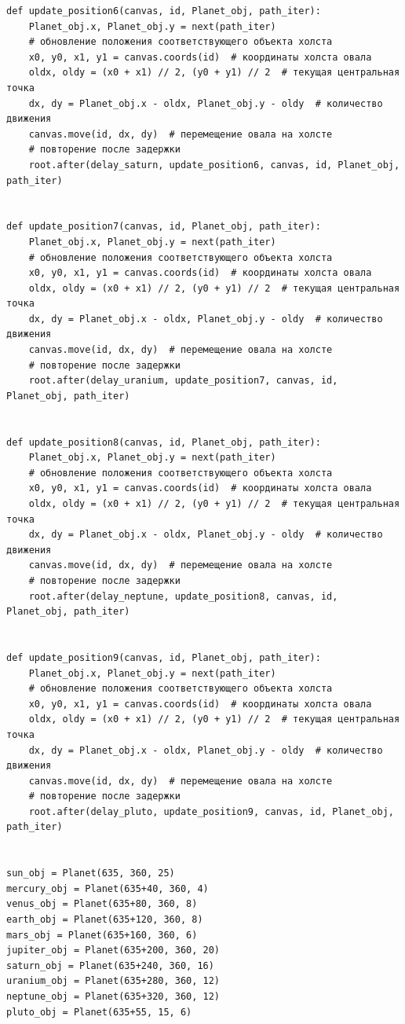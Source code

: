 \documentclass[11pt,a4paper]{report}
\begin{document}
\begin{verbatim}
def update_position6(canvas, id, Planet_obj, path_iter):
    Planet_obj.x, Planet_obj.y = next(path_iter)  
    # обновление положения соответствующего объекта холста
    x0, y0, x1, y1 = canvas.coords(id)  # координаты холста овала
    oldx, oldy = (x0 + x1) // 2, (y0 + y1) // 2  # текущая центральная точка
    dx, dy = Planet_obj.x - oldx, Planet_obj.y - oldy  # количество движения
    canvas.move(id, dx, dy)  # перемещение овала на холсте
    # повторение после задержки
    root.after(delay_saturn, update_position6, canvas, id, Planet_obj, path_iter)


def update_position7(canvas, id, Planet_obj, path_iter):
    Planet_obj.x, Planet_obj.y = next(path_iter) 
    # обновление положения соответствующего объекта холста
    x0, y0, x1, y1 = canvas.coords(id)  # координаты холста овала
    oldx, oldy = (x0 + x1) // 2, (y0 + y1) // 2  # текущая центральная точка
    dx, dy = Planet_obj.x - oldx, Planet_obj.y - oldy  # количество движения
    canvas.move(id, dx, dy)  # перемещение овала на холсте
    # повторение после задержки
    root.after(delay_uranium, update_position7, canvas, id, Planet_obj, path_iter)


def update_position8(canvas, id, Planet_obj, path_iter):
    Planet_obj.x, Planet_obj.y = next(path_iter) 
    # обновление положения соответствующего объекта холста
    x0, y0, x1, y1 = canvas.coords(id)  # координаты холста овала
    oldx, oldy = (x0 + x1) // 2, (y0 + y1) // 2  # текущая центральная точка
    dx, dy = Planet_obj.x - oldx, Planet_obj.y - oldy  # количество движения
    canvas.move(id, dx, dy)  # перемещение овала на холсте
    # повторение после задержки
    root.after(delay_neptune, update_position8, canvas, id, Planet_obj, path_iter)


def update_position9(canvas, id, Planet_obj, path_iter):
    Planet_obj.x, Planet_obj.y = next(path_iter)  
    # обновление положения соответствующего объекта холста
    x0, y0, x1, y1 = canvas.coords(id)  # координаты холста овала
    oldx, oldy = (x0 + x1) // 2, (y0 + y1) // 2  # текущая центральная точка
    dx, dy = Planet_obj.x - oldx, Planet_obj.y - oldy  # количество движения
    canvas.move(id, dx, dy)  # перемещение овала на холсте
    # повторение после задержки
    root.after(delay_pluto, update_position9, canvas, id, Planet_obj, path_iter)


sun_obj = Planet(635, 360, 25)
mercury_obj = Planet(635+40, 360, 4)
venus_obj = Planet(635+80, 360, 8)
earth_obj = Planet(635+120, 360, 8)
mars_obj = Planet(635+160, 360, 6)
jupiter_obj = Planet(635+200, 360, 20)
saturn_obj = Planet(635+240, 360, 16)
uranium_obj = Planet(635+280, 360, 12)
neptune_obj = Planet(635+320, 360, 12)
pluto_obj = Planet(635+55, 15, 6)


\end{verbatim}
\end{document}
